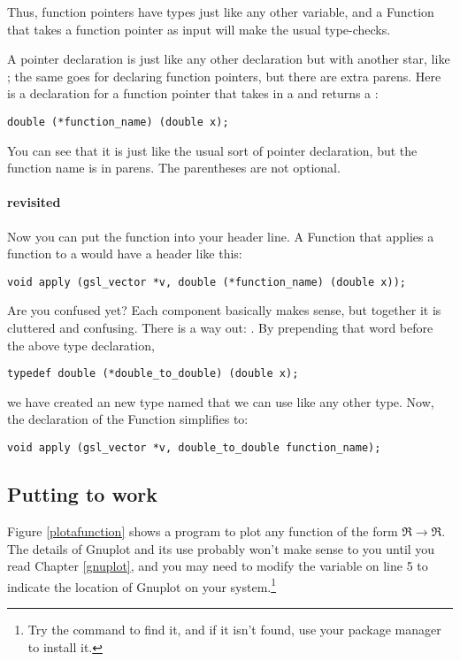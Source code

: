 Thus, function pointers have types just like any other variable, and a
Function that takes a function pointer as input will make the usual
type-checks.

A pointer declaration is just like any other declaration but with
another star, like ; the same goes for declaring function
pointers, but there are extra parens. Here is a declaration for a
function pointer that takes in a  and returns a :
\begin{lstlisting}
double (*function_name) (double x);
\end{lstlisting}
You can see that it is just like the usual  sort of pointer
declaration, but the function name is in parens.  The parentheses are not
optional.

\paragraph{ revisited}
Now you can put the function into your header line. A Function that
applies a function to a  would have a header like
this:
\begin{lstlisting}
void apply (gsl_vector *v, double (*function_name) (double x));
\end{lstlisting}

Are you confused yet? Each component basically makes sense, but together
it is cluttered and confusing. There is a way out: . By prepending
that word before the above type declaration,
\begin{lstlisting}
typedef double (*double_to_double) (double x);
\end{lstlisting}
we have created an new type named  that we can
use like any other type. Now, the declaration of the  Function
simplifies to:
\begin{lstlisting}[emph={double_to_double,gsl_vector}]
void apply (gsl_vector *v, double_to_double function_name);
\end{lstlisting}

\subsection{Putting  to work}
Figure \ref{plotafunction} shows a program to plot any function of the
form $\Re\to\Re$. The
details of Gnuplot and its use probably won't make sense to you until
you read Chapter \ref{gnuplot}, and you may need to modify the
 variable on line 5 to indicate the location of Gnuplot on
your system.\footnote{Try the command  to find it,
and if it isn't found, use your package manager to install it.}

